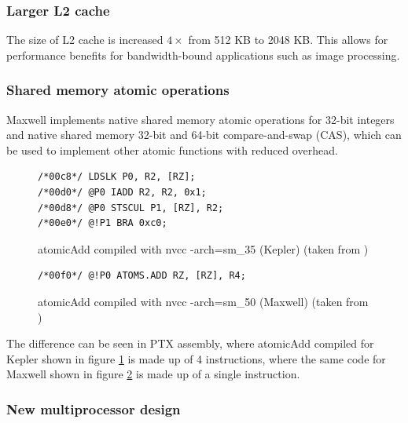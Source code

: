 \subsubsection{Larger L2 cache}

The size of L2 cache is increased $4 \times$ from 512 KB to 2048 KB. This allows for performance benefits for bandwidth-bound applications such as image processing.

\subsubsection{Shared memory atomic operations}

\FloatBarrier

Maxwell implements native shared memory atomic operations for 32-bit integers and native shared memory 32-bit and 64-bit compare-and-swap (CAS), which can be used to implement other atomic functions with reduced overhead.

\begin{figure}
\begin{verbatim}
/*00c8*/ LDSLK P0, R2, [RZ];                          
/*00d0*/ @P0 IADD R2, R2, 0x1;                            
/*00d8*/ @P0 STSCUL P1, [RZ], R2;                         
/*00e0*/ @!P1 BRA 0xc0;                                   
\end{verbatim}
\caption{atomicAdd compiled with nvcc -arch=sm\_35 (Kepler) (taken from \cite{first-experience-maxwell})}
\label{code:atomic-add-kepler}
\end{figure}

\begin{figure}
\begin{verbatim}
/*00f0*/ @!P0 ATOMS.ADD RZ, [RZ], R4;                                 
\end{verbatim}
\caption{atomicAdd compiled with nvcc -arch=sm\_50 (Maxwell) (taken from \cite{first-experience-maxwell})} 
\label{code:atomic-add-maxwell}
\end{figure}

The difference can be seen in PTX assembly, where atomicAdd compiled for Kepler shown in figure \ref{code:atomic-add-kepler} is made up of 4 instructions, where the same code for Maxwell shown in figure \ref{code:atomic-add-maxwell} is made up of a single instruction.

\subsubsection{New multiprocessor design} \label{subsubsec:cuda-new-multip}

